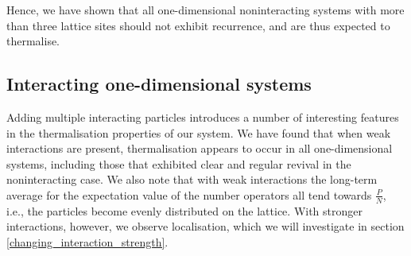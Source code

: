 \documentclass[a4paper, 10pt]{article}
\theoremstyle{plain}
\begin{document}
Hence, we have shown that all one-dimensional noninteracting systems with more
than three lattice sites should not exhibit recurrence, and are thus expected
to thermalise.


\subsection{Interacting one-dimensional systems}

Adding multiple interacting particles introduces a number of interesting
features in the thermalisation properties of our system. We have found that when
weak interactions are present, thermalisation appears to occur in all
one-dimensional systems, including those that exhibited clear and regular
revival in the noninteracting case. We also note that with weak interactions the
long-term average for the expectation value of the number operators all tend
towards $\frac{P}{N}$, i.e., the particles become evenly distributed on the
lattice. With stronger interactions, however, we observe localisation, which we
will investigate in section \ref{changing_interaction_strength}.
\end{document}
